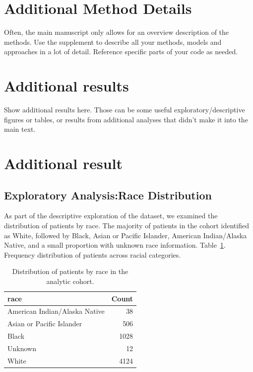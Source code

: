 \documentclass[
  letterpaper,
  DIV=11,
  numbers=noendperiod]{scrartcl}
\begin{document}
\newpage{}

\section{Additional Method Details}\label{additional-method-details}

Often, the main manuscript only allows for an overview description of
the methods. Use the supplement to describe all your methods, models and
approaches in a lot of detail. Reference specific parts of your code as
needed.

\newpage{}

\section{Additional results}\label{additional-results}

Show additional results here. Those can be some useful
exploratory/descriptive figures or tables, or results from additional
analyses that didn't make it into the main text.

\section{Additional result}\label{additional-result}

\subsection{Exploratory Analysis:Race
Distribution}\label{exploratory-analysisrace-distribution}

As part of the descriptive exploration of the dataset, we examined the
distribution of patients by race. The majority of patients in the cohort
identified as White, followed by Black, Asian or Pacific Islander,
American Indian/Alaska Native, and a small proportion with unknown race
information. Table~\ref{tbl-race-summary}. Frequency distribution of
patients across racial categories.

\begin{longtable}[]{@{}lr@{}}

\caption{\label{tbl-race-summary}Distribution of patients by race in the
analytic cohort.}

\tabularnewline

\toprule\noalign{}
race & Count \\
\midrule\noalign{}
\endhead
\bottomrule\noalign{}
\endlastfoot
American Indian/Alaska Native & 38 \\
Asian or Pacific Islander & 506 \\
Black & 1028 \\
Unknown & 12 \\
White & 4124 \\

\end{longtable}
\end{document}
